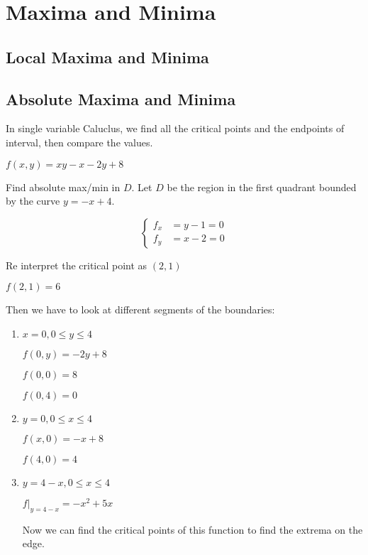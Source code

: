 \section{Maxima and Minima}

\subsection{Local Maxima and Minima}


\subsection{Absolute Maxima and Minima}

In single variable Caluclus, we find all the critical points and the endpoints of interval, then compare the values.

\begin{example}
	$f(x, y) = xy - x - 2y + 8$

	Find absolute max/min in $D$. Let $D$ be the region in the first quadrant bounded by the curve $y = -x + 4$.
\end{example}

\begin{sol}
	\begin{equation}
		\begin{cases}
			f_x &= y - 1 = 0\\
			f_y &= x - 2 = 0
		\end{cases}
	\end{equation}

	Re interpret the critical point as $(2, 1)$

	$f(2, 1) = 6$

	Then we have to look at different segments of the boundaries:

	\begin{enumerate}
		\item $x = 0, 0 \leq y \leq 4$
		
		$f(0, y) = -2y + 8$

		$f(0, 0) = 8$

		$f(0, 4) = 0$

		\item $y = 0, 0 \leq x \leq 4$
		
		$f(x, 0) = -x + 8$

		$f(4, 0) = 4$

		\item $y = 4 - x, 0 \leq x \leq 4$
		
		$f\vert_{y=4-x} = -x^2 + 5x$

		Now we can find the critical points of this function to find the extrema on the edge.
	\end{enumerate}
\end{sol}

